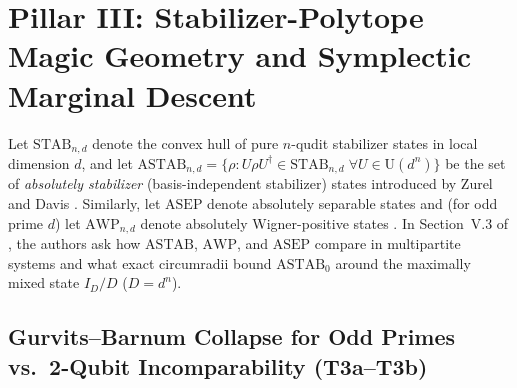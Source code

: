 \documentclass[11pt,reqno]{amsart}
\theoremstyle{definition}
\newcommand{\STAB}{\mathrm{STAB}}
\newcommand{\ASTAB}{\mathrm{ASTAB}}
\newcommand{\AWP}{\mathrm{AWP}}
\newcommand{\ASEP}{\mathrm{ASEP}}
\begin{document}
\section{Pillar III: Stabilizer-Polytope Magic Geometry and Symplectic Marginal Descent}
\label{sec:pillar3}

Let $\STAB_{n,d}$ denote the convex hull of pure $n$-qudit stabilizer states in local
dimension $d$, and let $\ASTAB_{n,d} = \{\rho : U \rho U^\dagger \in \STAB_{n,d}\;\forall
U \in \mathrm{U}(d^n)\}$ be the set of \emph{absolutely stabilizer} (basis-independent
stabilizer) states introduced by Zurel and Davis \cite{zurel2026astab}. Similarly, let
$\ASEP$ denote absolutely separable states and (for odd prime $d$) let $\AWP_{n,d}$ denote
absolutely Wigner-positive states \cite{gross2006hudson,zurel2026astab}. In Section~V.3 of
\cite{zurel2026astab}, the authors ask how $\ASTAB$, $\AWP$, and $\ASEP$ compare in
multipartite systems and what exact circumradii bound $\ASTAB_0$ around the maximally
mixed state $I_D/D$ ($D = d^n$).

\subsection{Gurvits--Barnum Collapse for Odd Primes vs.\ 2-Qubit Incomparability (T3a--T3b)}
\end{document}
